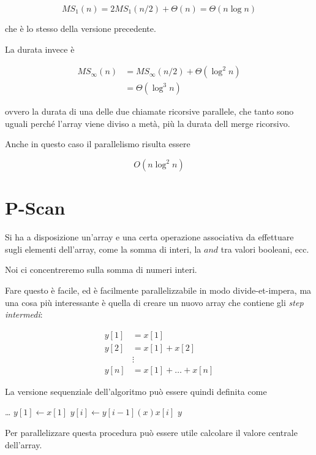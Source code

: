 $$
MS_1(n) = 2 MS_1(n/2) + \Theta(n) = \Theta (n \log n)
$$

che è lo stesso della versione precedente.

La durata invece è

\begin{align*}
MS_\infty (n) &= MS_\infty (n/2) + \Theta(\log^2 n) \\
              &=\Theta (\log^3 n)
\end{align*}

ovvero la durata di una delle due chiamate ricorsive parallele, che tanto sono uguali perché l'array viene diviso a metà, più la durata dell merge ricorsivo.

Anche in questo caso il parallelismo risulta essere

$$
O(n \log^2 n)
$$

\section{P-Scan}\label{p-scan}

Si ha a disposizione un'array e una certa operazione associativa da effettuare sugli elementi dell'array, come la somma di interi, la $and$ tra valori booleani, ecc.

Noi ci concentreremo sulla somma di numeri interi.

Fare questo è facile, ed è facilmente parallelizzabile in modo divide-et-impera, ma una cosa più interessante è quella di creare un nuovo array che contiene gli \emph{step intermedi}:

\begin{align*}
y[1] &= x[1] \\
y[2] &= x[1] + x[2] \\
&\vdots \\
y[n] &= x[1] + \ldots + x[n]
\end{align*}

La versione sequenziale dell'algoritmo può essere quindi definita come

\begin{breakablealgorithm}
\begin{algorithmic}[1]
\State \ldots
\State $y[1] \gets x[1]$
    \State $y[i]\gets y[i-1] (x) x[i]$
\EndFor
\State \Return $y$
\EndFunction
\end{algorithmic}
\end{breakablealgorithm}

Per parallelizzare questa procedura può essere utile calcolare il valore centrale dell'array.

